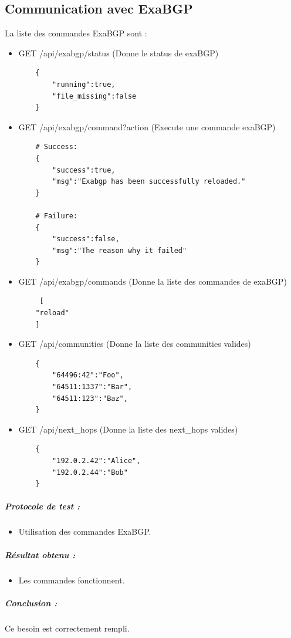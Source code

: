 \subsection{Communication avec ExaBGP}
\label{sssec:exabgp}
\noindent
La liste des commandes ExaBGP sont :
\begin{itemize}
    \item GET /api/exabgp/status (Donne le status de exaBGP)
    \begin{verbatim}
    {
        "running":true,
        "file_missing":false
    }
    \end{verbatim}
    
    \item GET /api/exabgp/command{?action} (Execute une commande exaBGP)
    \begin{verbatim}
    # Success:
    {
        "success":true,
        "msg":"Exabgp has been successfully reloaded."
    }

    # Failure:
    {
        "success":false,
        "msg":"The reason why it failed"
    }
    \end{verbatim}
    
    \item GET /api/exabgp/commands (Donne la liste des commandes de exaBGP)
    \begin{verbatim}
     [
    "reload"
    ]
    \end{verbatim}
    
    \item GET /api/communities (Donne la liste des communities valides)
    \begin{verbatim}
    {
        "64496:42":"Foo",
        "64511:1337":"Bar",
        "64511:123":"Baz",
    }
    \end{verbatim}
    
    \item GET /api/next\_hops (Donne la liste des next\_hops valides)
    \begin{verbatim}
    {
        "192.0.2.42":"Alice",
        "192.0.2.44":"Bob"
    }
    \end{verbatim}

\end{itemize}

\subparagraph{Protocole de test :}
\begin{itemize}
    \item Utilisation des commandes ExaBGP.
\end{itemize}
\subparagraph{Résultat obtenu :}
    \begin{itemize}
    \item Les commandes fonctionnent.
\end{itemize}
\subparagraph{Conclusion :}Ce besoin est correctement rempli.


